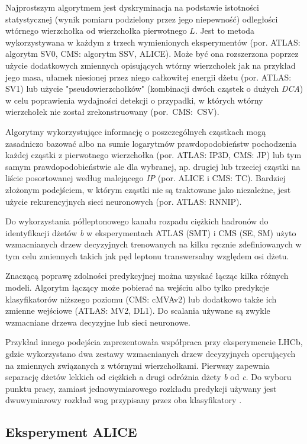 Najprostszym algorytmem jest dyskryminacja na podstawie istotności statystycznej (wynik pomiaru podzielony przez jego niepewność) odległości wtórnego wierzchołka od wierzchołka pierwotnego $L$. Jest to metoda wykorzystywana w  każdym z trzech wymienionych eksperymentów (por. ATLAS: algorytm SV0, CMS: algorytm SSV, ALICE). 
Może być ona rozszerzona poprzez użycie dodatkowych zmiennych opisujących wtórny wierzchołek jak na przykład jego masa, ułamek niesionej przez niego całkowitej energii dżetu (por. ATLAS: SV1) lub użycie "pseudowierzchołków" (kombinacji dwóch cząstek o dużych \textit{DCA}) w celu poprawienia wydajności detekcji o przypadki, w których wtórny wierzchołek nie został zrekonstruowany (por.~CMS:~CSV).

Algorytmy wykorzystujące informację o poszczególnych cząstkach mogą zasadniczo bazować albo na sumie logarytmów prawdopodobieństw pochodzenia każdej cząstki z pierwotnego wierzchołka (por. ATLAS: IP3D, CMS: JP) lub tym samym prawdopodobieństwie ale dla wybranej, np. drugiej lub trzeciej cząstki na liście posortowanej według malejącego \textit{IP} (por. ALICE i CMS: TC). Bardziej złożonym podejściem, w którym cząstki nie są traktowane jako niezależne, jest użycie rekurencyjnych sieci neuronowych (por. ATLAS: RNNIP).

Do wykorzystania półleptonowego kanału rozpadu ciężkich hadronów do identyfikacji dżetów \textit{b} w eksperymentach ATLAS (SMT) i CMS (SE, SM) użyto wzmacnianych drzew decyzyjnych trenowanych na kilku ręcznie zdefiniowanych w tym celu zmiennych takich jak pęd leptonu transwersalny względem osi dżetu.

Znaczącą poprawę zdolności predykcyjnej można uzyskać łącząc kilka różnych modeli. 
Algorytm łączący może pobierać na wejściu albo tylko predykcje klasyfikatorów niższego poziomu (CMS: cMVAv2) lub dodatkowo także ich zmienne wejściowe (ATLAS: MV2, DL1). Do scalania używane są zwykle wzmacniane drzewa decyzyjne lub sieci neuronowe.

Przykład innego podejścia zaprezentowała współpraca przy eksperymencie LHCb, gdzie wykorzystano dwa zestawy wzmacnianych drzew decyzyjnych operujących na zmiennych związanych z wtórnymi wierzchołkami. Pierwszy zapewnia separację dżetów lekkich od ciężkich a drugi odróżnia dżety \textit{b} od \textit{c}. 
Do wyboru punktu pracy, zamiast jednowymiarowego rozkładu predykcji używany jest dwuwymiarowy rozkład wag przypisany przez oba klasyfikatory \cite{Aaij:2015yqa}.


\subsection{Eksperyment ALICE}

